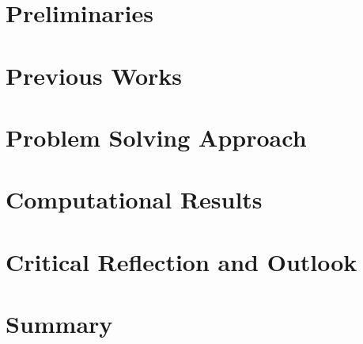\documentclass[a4paper,11pt,twoside]{memoir}
\begin{document}
\chapter{Preliminaries}
\label{ch:prelim}


%

\chapter{Previous Works}
\label{ch:previous}


\chapter{Problem Solving Approach}
\label{ch:approach}


\chapter{Computational Results}
\label{ch:typo}


\chapter{Critical Reflection and Outlook}
\label{ch:outlook}


\chapter{Summary}
\label{ch:summary}






\appendix



\end{document}
